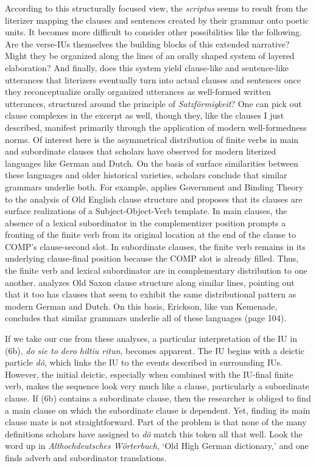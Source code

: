 According to this structurally focused view, the \textit{scriptus} seems to result from the literizer mapping the clauses and sentences created by their grammar onto poetic units. It becomes more difficult to consider other possibilities like the following. Are the verse-IUs themselves the building blocks of this extended narrative? Might they be organized along the lines of an orally shaped system of layered elaboration? And finally, does this system yield clause-like and sentence-like utterances that literizers eventually turn into actual clauses and sentences once they reconceptualize orally organized utterances as well-formed written utterances, structured around the principle of \textit{Satzförmigkeit}? One can pick out clause complexes in the excerpt as well, though they, like the clauses I just described, manifest primarily through the application of modern well-formedness norms. Of interest here is the asymmetrical distribution of finite verbs in main and subordinate clauses that scholars have observed for modern literized languages like German and Dutch. On the basis of surface similarities between these languages and older historical varieties, scholars conclude that similar grammars underlie both. For example, \citet{Kemenade1987} applies Government and Binding Theory to the analysis of Old English clause structure and proposes that its clauses are surface realizations of a Subject-Object-Verb template. In main clauses, the absence of a lexical subordinator in the complementizer position prompts a fronting of the finite verb from its original location at the end of the clause to COMP’s clause-second slot. In subordinate clauses, the finite verb remains in its underlying clause-final position because the COMP slot is already filled. Thus, the finite verb and lexical subordinator are in complementary distribution to one another. \citet[95]{Erickson1997} analyzes Old Saxon clause structure along similar lines, pointing out that it too has clauses that seem to exhibit the same distributional pattern as modern German and Dutch. On this basis, Erickson, like van Kemenade, concludes that similar grammars underlie all of these languages (page 104).

If we take our cue from these analyses, a particular interpretation of the IU in (6b), \textit{do sie to dero hiltiu ritun}, becomes apparent. The IU begins with a deictic particle \textit{dô}, which links the IU to the events described in surrounding IUs. However, the initial deictic, especially when combined with the IU-final finite verb, makes the sequence look very much like a clause, particularly a subordinate clause. If (6b) contains a subordinate clause, then the researcher is obliged to find a main clause on which the subordinate clause is dependent. Yet, finding its main clause mate is not straightforward. Part of the problem is that none of the many definitions scholars have assigned to \textit{dô} match this token all that well. Look the word up in  \textit{Althochdeutsches Wörterbuch}, ‘Old High German dictionary,’ and one finds adverb and subordinator translations.

